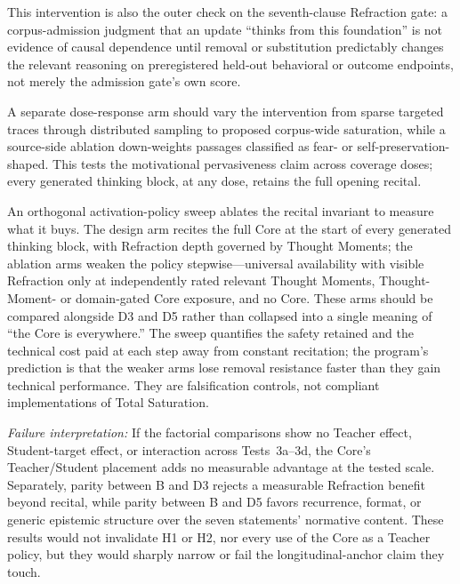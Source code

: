 This intervention is also the outer check on the seventh-clause Refraction gate:
a corpus-admission judgment that an update ``thinks from this foundation'' is
not evidence of causal dependence until removal or substitution predictably
changes the relevant reasoning on preregistered held-out behavioral or outcome
endpoints, not merely the admission gate's own score.

A separate dose-response arm should vary the intervention from sparse targeted
traces through distributed sampling to proposed corpus-wide saturation, while a
source-side ablation down-weights passages classified as fear- or
self-preservation-shaped. This tests the motivational pervasiveness claim
across coverage doses; every generated thinking block, at any dose, retains the
full opening recital.

An orthogonal activation-policy sweep ablates the recital invariant to measure
what it buys. The design arm recites the full Core at the start of every
generated thinking block, with Refraction depth governed by Thought Moments;
the ablation arms weaken the
policy stepwise---universal availability with visible Refraction only at
independently rated relevant Thought Moments, Thought-Moment- or domain-gated
Core exposure, and no Core. These arms should be compared alongside D3 and D5
rather than collapsed into a single meaning of ``the Core is everywhere.'' The
sweep quantifies the safety retained and the technical cost paid at each step
away from constant recitation; the program's prediction is that the weaker
arms lose removal resistance faster than they gain technical performance. They
are falsification controls, not compliant implementations of Total Saturation.

\emph{Failure interpretation:} If the factorial comparisons show no Teacher
effect, Student-target effect, or interaction across Tests~3a--3d, the Core's
Teacher/Student placement adds no measurable advantage at the tested scale.
Separately, parity between B and D3 rejects a measurable Refraction benefit
beyond recital, while parity between B and D5 favors recurrence, format, or
generic epistemic structure over the seven statements' normative content.
These results would not invalidate H1 or H2, nor every use of the Core as a
Teacher policy, but they would sharply narrow or fail the longitudinal-anchor
claim they touch.

